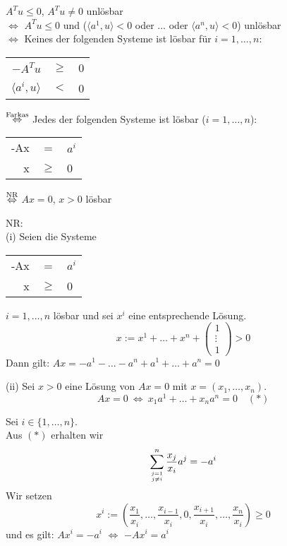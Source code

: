 \documentclass[a4paper,11pt,twoside,titlepage]{article}
\begin{document}
$A^Tu\leq 0$, $A^Tu\neq 0$ unlösbar\\
$\Leftrightarrow$ $A^Tu\leq 0$ und ($\langle a^1,u\rangle<0$ oder $\ldots$ oder $\langle a^n,u\rangle<0$) unlösbar\\
$\Leftrightarrow$ Keines der folgenden Systeme ist lösbar für $i=1,\ldots,n$:
\begin{center}
\begin{tabular}{|rcl|}\hline
$-A^Tu$&$\geq$&0\\
$\langle a^i,u\rangle$&$<$&0\\\hline
\end{tabular}
\end{center}
$\stackrel{\textnormal{\scriptsize{Farkas}}}{\Leftrightarrow}$ Jedes der folgenden Systeme ist lösbar ($i=1,\ldots,n$): 
\begin{center}
\begin{tabular}{|rcl|}\hline
-Ax&=&$a^i$\\
x&$\geq$&0\\\hline
\end{tabular}
\end{center}
$\stackrel{\textnormal{\scriptsize{NR}}}{\Leftrightarrow}$ $Ax=0$, $x>0$ lösbar

NR:\\
(i) Seien die Systeme 
\begin{center}
\begin{tabular}{|rcl|}\hline
-Ax&=&$a^i$\\
x&$\geq$&0\\\hline
\end{tabular}
\end{center}
$i=1,\ldots,n$ lösbar und sei $x^i$ eine entsprechende Lösung.
\[x:=x^1+\ldots+x^n+\begin{pmatrix}1\\\vdots\\1\end{pmatrix}>0\]
Dann gilt: $Ax=-a^1-\ldots-a^n+a^1+\ldots+a^n=0$

(ii) Sei $x>0$ eine Lösung von $Ax=0$ mit $x=(x_1,\ldots,x_n)$.
\[Ax=0\ \Leftrightarrow\ x_1a^1+\ldots+x_na^n=0\quad(\ast)\]

Sei $i\in\{1,\ldots,n\}$.\\
Aus $(\ast)$ erhalten wir
\[\sum_{j=1\atop j\neq i}^n\frac{x_j}{x_i}a^j=-a^i\]
Wir setzen 
\[x^i:=(\frac{x_1}{x_i},\ldots,\frac{x_{i-1}}{x_i},0,\frac{x_{i+1}}{x_i},\ldots,\frac{x_n}{x_i})\geq0\]
und es gilt: $Ax^i=-a^i$ $\Leftrightarrow$ $-Ax^i=a^i$
\end{document}
